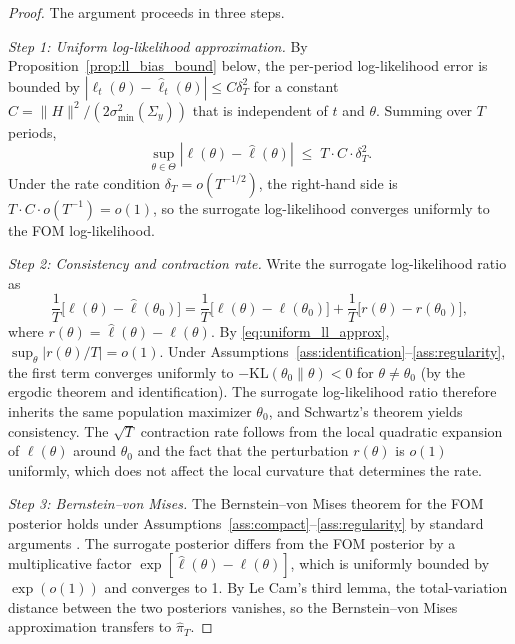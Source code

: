 \documentclass[12pt]{article}
\theoremstyle{plain}
\theoremstyle{definition}
\theoremstyle{remark}
\newcommand{\Sigmay}{\Sigma_y}
\begin{document}
\begin{proof}
The argument proceeds in three steps.

\textit{Step 1: Uniform log-likelihood approximation.}
By Proposition~\ref{prop:ll_bias_bound} below, the per-period log-likelihood error is bounded by $|\ell_t(\theta) - \hat{\ell}_t(\theta)| \leq C \delta_T^2$ for a constant $C = \|H\|^2 / (2\sigma_{\min}^2(\Sigmay))$ that is independent of $t$ and $\theta$. Summing over $T$ periods,
\begin{equation}
\sup_{\theta \in \Theta}
  |\ell(\theta) - \hat{\ell}(\theta)|
  \;\leq\; T \cdot C \cdot \delta_T^2.
\label{eq:uniform_ll_approx}
\end{equation}
Under the rate condition $\delta_T = o(T^{-1/2})$, the right-hand side is $T \cdot C \cdot o(T^{-1}) = o(1)$, so the surrogate log-likelihood converges uniformly to the FOM log-likelihood.

\textit{Step 2: Consistency and contraction rate.}
Write the surrogate log-likelihood ratio as
\[
\frac{1}{T}\bigl[\hat{\ell}(\theta) - \hat{\ell}(\theta_0)\bigr]
= \frac{1}{T}\bigl[\ell(\theta) - \ell(\theta_0)\bigr]
  + \frac{1}{T}\bigl[r(\theta) - r(\theta_0)\bigr],
\]
where $r(\theta) = \hat{\ell}(\theta) - \ell(\theta)$. By \eqref{eq:uniform_ll_approx}, $\sup_\theta |r(\theta)/T| = o(1)$. Under Assumptions~\ref{ass:identification}--\ref{ass:regularity}, the first term converges uniformly to $-\text{KL}(\theta_0 \| \theta) < 0$ for $\theta \neq \theta_0$ (by the ergodic theorem and identification). The surrogate log-likelihood ratio therefore inherits the same population maximizer $\theta_0$, and Schwartz's theorem \citep{schwartz1965bayes} yields consistency. The $\sqrt{T}$ contraction rate follows from the local quadratic expansion of $\ell(\theta)$ around $\theta_0$ and the fact that the perturbation $r(\theta)$ is $o(1)$ uniformly, which does not affect the local curvature that determines the rate.

\textit{Step 3: Bernstein--von Mises.}
The Bernstein--von Mises theorem for the FOM posterior holds under Assumptions~\ref{ass:compact}--\ref{ass:regularity} by standard arguments \citep{van2000asymptotic}. The surrogate posterior differs from the FOM posterior by a multiplicative factor $\exp[\hat{\ell}(\theta) - \ell(\theta)]$, which is uniformly bounded by $\exp(o(1))$ and converges to 1. By Le Cam's third lemma, the total-variation distance between the two posteriors vanishes, so the Bernstein--von Mises approximation transfers to $\hat{\pi}_T$.
\end{proof}
\end{document}
